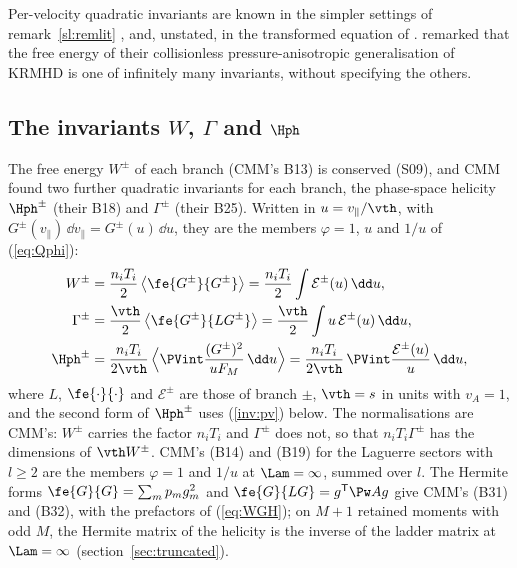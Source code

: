 Per-velocity quadratic invariants are known in the simpler settings of remark~\ref{sl:remlit} \citep{PlunkParker2014,Plunk2015}, and, unstated, in the transformed equation of \citet[eq.~85]{Heninger2018}. \citet[\S5.1]{Kunz2015} remarked that the free energy of their collisionless pressure-anisotropic generalisation of KRMHD is one of infinitely many invariants, without specifying the others.

\subsection{The invariants \texorpdfstring{$W$, $\Gamma$ and $\Hph$}{W, Gamma and H}}\label{inv:cmm}

The free energy $W^\pm$ of each branch (CMM's B13) is conserved (S09), and CMM found two further quadratic invariants for each branch, the phase-space helicity $\Hph^\pm$ (their B18) and $\Gamma^\pm$ (their B25). Written in $u=v_\parallel/\vth$, with $G^\pm(v_\parallel)\,\dd v_\parallel=G^\pm(u)\,\dd u$, they are the members $\varphi=1$, $u$ and $1/u$ of (\ref{eq:Qphi}):
\begin{equation}\label{eq:WGH}
\begin{aligned}
  W^\pm&=\frac{n_iT_i}{2}\,\big\langle\fe{G^\pm}{G^\pm}\big\rangle=\frac{n_iT_i}{2}\int\mathcal E^\pm(u)\,\dd u,\\
  \Gamma^\pm&=\frac{\vth}{2}\,\big\langle\fe{G^\pm}{LG^\pm}\big\rangle=\frac{\vth}{2}\int u\,\mathcal E^\pm(u)\,\dd u,\\
  \Hph^\pm&=\frac{n_iT_i}{2\vth}\,\Big\langle\PVint\frac{(G^\pm)^2}{uF_M}\,\dd u\Big\rangle=\frac{n_iT_i}{2\vth}\,\PVint\frac{\mathcal E^\pm(u)}{u}\,\dd u ,
\end{aligned}
\end{equation}
where $L$, $\fe{\cdot}{\cdot}$ and $\mathcal E^\pm$ are those of branch $\pm$, $\vth=s$ in units with $v_A=1$, and the second form of $\Hph^\pm$ uses (\ref{inv:pv}) below. The normalisations are CMM's: $W^\pm$ carries the factor $n_iT_i$ and $\Gamma^\pm$ does not, so that $n_iT_i\Gamma^\pm$ has the dimensions of $\vth W^\pm$. CMM's (B14) and (B19) for the Laguerre sectors with $l\ge2$ are the members $\varphi=1$ and $1/u$ at $\Lam=\infty$, summed over $l$. The Hermite forms $\fe{G}{G}=\sum_mp_mg_m^2$ and $\fe{G}{LG}=g^{\mathsf T}\Pw Ag$ give CMM's (B31) and (B32), with the prefactors of (\ref{eq:WGH}); on $M+1$ retained moments with odd $M$, the Hermite matrix of the helicity is the inverse of the ladder matrix at $\Lam=\infty$ (section~\ref{sec:truncated}).

